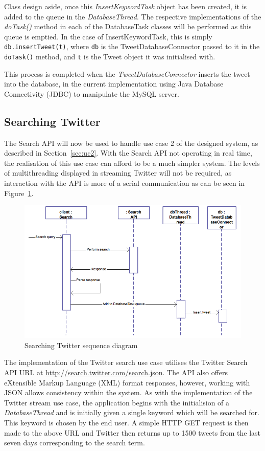 Class design aside, once this \emph{InsertKeywordTask} object has been created, it is added to the queue in the \emph{DatabaseThread}. The respective implementations of the \emph{doTask()} method in each of the DatabaseTask classes will be performed as this queue is emptied. In the case of InsertKeywordTask, this is simply \texttt{db.insertTweet(t)}, where \texttt{db} is the TweetDatabaseConnector passed to it in the \texttt{doTask()} method, and \texttt{t} is the Tweet object it was initialised with.

This process is completed when the \emph{TweetDatabaseConnector} inserts the tweet into the database, in the current implementation using Java Database Connectivity (JDBC) to manipulate the MySQL server.

\subsection{Searching Twitter}
\label{sec:searchjava}
The Search API will now be used to handle use case 2 of the designed system, as described in Section~\ref{sec:uc2}. With the Search API not operating in real time, the realisation of this use case can afford to be a much simpler system. The levels of multithreading displayed in streaming Twitter will not be required, as interaction with the API is more of a serial communication as can be seen in Figure~\ref{fig:ucsearch}.

\begin{figure}[h]
\begin{center}
\includegraphics[width=13cm]{ucsearch}
\end{center}
\caption{Searching Twitter sequence diagram}
\label{fig:ucsearch}
\end{figure}

The implementation of the Twitter search use case utilises the Twitter Search API URL at \url{http://search.twitter.com/search.json}. The API also offers eXtensible Markup Language (XML) format responses, however, working with JSON allows consistency within the system. As with the implementation of the Twitter stream use case, the application begins with the initialision of a \emph{DatabaseThread} and is initially given a single keyword which will be searched for. This keyword is chosen by the end user. A simple HTTP GET request is then made to the above URL and Twitter then returns up to 1500 tweets from the last seven days corresponding to the search term.

